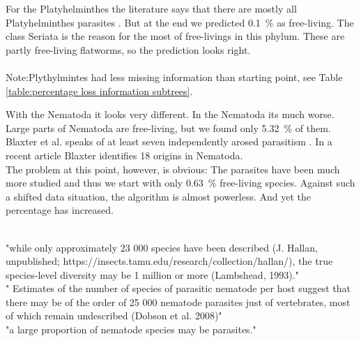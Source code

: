       For the Platyhelminthes the literature says that there are mostly all Platyhelminthes parasites
        . But at the end we predicted 0.1~\% as free-living. The class Seriata is the 
        reason for the most of free-livings in this phylum. These are partly free-living flatworms, so 
        the prediction looks right. \\
         \\
      Note:Plythylmintes had less missing information than starting point, see Table \ref{table:percentage loss information subtrees}.

      With the Nematoda it looks very different. In the Nematoda its much worse. Large parts of Nematoda 
        are free-living, but we found only 5.32~\% of them. Blaxter et al. speaks of at least seven 
        independently arosed parasitism \cite{Blaxter1998}. In a recent article Blaxter identifies 18 
        origins \cite{Blaxter2015} in Nematoda. \\
        The problem at this point, however, is obvious: The parasites have been much more studied and 
        thus we start with only 0.63~\% free-living species. Against such a shifted data situation, the 
        algorithm is almost powerless. And yet the percentage has increased.

       \\
      "while only approximately 23 000 species have been described (J. Hallan, unpublished; https://insects.tamu.edu/research/collection/hallan/), the true species-level diversity may be 1 million or more (Lambshead, 1993)." \\
      " Estimates of the number of species of parasitic nematode per host suggest that there may be of the order of 25 000 nematode parasites just of vertebrates, most of which remain undescribed (Dobson et al. 2008)" \\
      "a large proportion of nematode species may be parasites." \cite{Blaxter2015} \\

